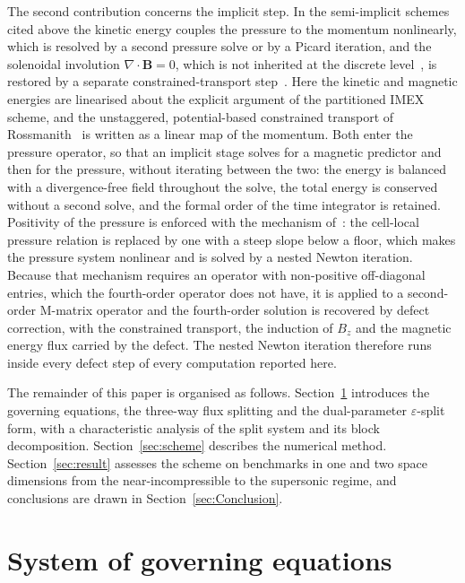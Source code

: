 \documentclass[a4paper,fleqn]{cas-sc}
\theoremstyle{remark}
\begin{document}
The second contribution concerns the implicit step. In the semi-implicit schemes
cited above the kinetic energy couples the pressure to the momentum
nonlinearly, which is resolved by a second pressure solve or by a Picard
iteration, and the solenoidal involution $\nabla\!\cdot\!\mathbf B=0$, which is
not inherited at the discrete level~\cite{Toth2000}, is restored by a separate
constrained-transport step~\cite{EvansHawley1988,Rossmanith2006}. Here the
kinetic and magnetic energies are linearised about the explicit argument of the
partitioned IMEX scheme, and the unstaggered, potential-based constrained
transport of Rossmanith~\cite{Rossmanith2006} is written as a linear map of the
momentum. Both enter the pressure operator, so that an implicit stage solves
for a magnetic predictor and then for the pressure, without iterating between
the two: the energy is balanced with a divergence-free field throughout the
solve, the total energy is conserved without a second solve, and the formal
order of the time integrator is retained. Positivity of the pressure is enforced with the
mechanism of~\cite{MHDIMEX}: the cell-local pressure relation is replaced by one
with a steep slope below a floor, which makes the pressure system nonlinear and
is solved by a nested Newton iteration. Because that mechanism requires an
operator with non-positive off-diagonal entries, which the fourth-order operator
does not have, it is applied to a second-order M-matrix operator and the
fourth-order solution is recovered by defect correction, with the constrained
transport, the induction of $B_z$ and the magnetic energy flux carried by the
defect. The nested Newton iteration therefore runs inside every defect step of
every computation reported here.

The remainder of this paper is organised as follows. Section~\ref{sec:governing}
introduces the governing equations, the three-way flux splitting and the
dual-parameter $\varepsilon$-split form, with a characteristic analysis of the
split system and its block decomposition. Section~\ref{sec:scheme} describes the
numerical method. Section~\ref{sec:result} assesses the scheme on benchmarks in
one and two space dimensions from the near-incompressible to the supersonic regime, and conclusions are drawn in Section~\ref{sec:Conclusion}.
\section{System of governing equations}
\label{sec:governing}
\end{document}

